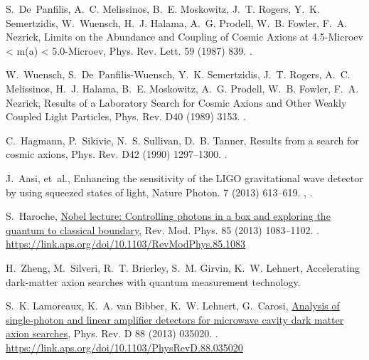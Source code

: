 \documentclass[preprint]{elsarticle}
\begin{document}
\begin{thebibliography}{10}
S.~De~Panfilis, A.~C. Melissinos, B.~E. Moskowitz, J.~T. Rogers, Y.~K.
  Semertzidis, W.~Wuensch, H.~J. Halama, A.~G. Prodell, W.~B. Fowler, F.~A.
  Nezrick, {Limits on the Abundance and Coupling of Cosmic Axions at
  4.5-Microev < m(a) < 5.0-Microev}, Phys. Rev. Lett. 59 (1987) 839.
\newblock \href {http://dx.doi.org/10.1103/PhysRevLett.59.839}
  {}.

W.~Wuensch, S.~De~Panfilis-Wuensch, Y.~K. Semertzidis, J.~T. Rogers, A.~C.
  Melissinos, H.~J. Halama, B.~E. Moskowitz, A.~G. Prodell, W.~B. Fowler, F.~A.
  Nezrick, {Results of a Laboratory Search for Cosmic Axions and Other Weakly
  Coupled Light Particles}, Phys. Rev. D40 (1989) 3153.
\newblock \href {http://dx.doi.org/10.1103/PhysRevD.40.3153}
  {}.

C.~Hagmann, P.~Sikivie, N.~S. Sullivan, D.~B. Tanner, {Results from a search
  for cosmic axions}, Phys. Rev. D42 (1990) 1297--1300.
\newblock \href {http://dx.doi.org/10.1103/PhysRevD.42.1297}
  {}.

J.~Aasi, et~al., {Enhancing the sensitivity of the LIGO gravitational wave
  detector by using squeezed states of light}, Nature Photon. 7 (2013)
  613--619.
\newblock \href {http://arxiv.org/abs/1310.0383} {},
  \href {http://dx.doi.org/10.1038/nphoton.2013.177}
  {}.

S.~Haroche, \href{https://link.aps.org/doi/10.1103/RevModPhys.85.1083}{Nobel
  lecture: Controlling photons in a box and exploring the quantum to classical
  boundary}, Rev. Mod. Phys. 85 (2013) 1083--1102.
\newblock \href {http://dx.doi.org/10.1103/RevModPhys.85.1083}
  {}.
\newline\urlprefix\url{https://link.aps.org/doi/10.1103/RevModPhys.85.1083}

H.~Zheng, M.~Silveri, R.~T. Brierley, S.~M. Girvin, K.~W. Lehnert,
  {Accelerating dark-matter axion searches with quantum measurement
  technology}\href {http://arxiv.org/abs/1607.02529} {}.

S.~K. Lamoreaux, K.~A. van Bibber, K.~W. Lehnert, G.~Carosi,
  \href{https://link.aps.org/doi/10.1103/PhysRevD.88.035020}{Analysis of
  single-photon and linear amplifier detectors for microwave cavity dark matter
  axion searches}, Phys. Rev. D 88 (2013) 035020.
\newblock \href {http://dx.doi.org/10.1103/PhysRevD.88.035020}
  {}.
\newline\urlprefix\url{https://link.aps.org/doi/10.1103/PhysRevD.88.035020}


\end{thebibliography}
\end{document}
